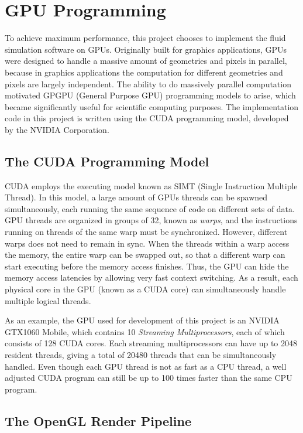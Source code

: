 \chapter{GPU Programming}

To achieve maximum performance, this project chooses to implement the fluid simulation software on GPUs. Originally built for graphics applications, GPUs were designed to handle a massive amount of geometries and pixels in parallel, because in graphics applications the computation for different geometries and pixels are largely independent. The ability to do massively parallel computation motivated GPGPU (General Purpose GPU) programming models to arise, which became significantly useful for scientific computing purposes. The implementation code in this project is written using the CUDA programming model, developed by the NVIDIA Corporation.

\section{The CUDA Programming Model}
CUDA employs the executing model known as SIMT (Single Instruction Multiple Thread). In this model, a large amount of GPUs threads can be spawned simultaneously, each running the same sequence of code on different sets of data. GPU threads are organized in groups of 32, known as \textit{warps}, and the instructions running on threads of the same warp must be synchronized. However, different warps does not need to remain in sync. When the threads within a warp access the memory, the entire warp can be swapped out, so that a different warp can start executing before the memory access finishes. Thus, the GPU can hide the memory access latencies by allowing very fast context switching. As a result, each physical core in the GPU (known as a CUDA core) can simultaneously handle multiple logical threads.

As an example, the GPU used for development of this project is an NVIDIA GTX1060 Mobile, which contains 10 \textit{Streaming Multiprocessors}, each of which consists of 128 CUDA cores. Each streaming multiprocessors can have up to 2048 resident threads, giving a total of 20480 threads that can be simultaneously handled. Even though each GPU thread is not as fast as a CPU thread, a well adjusted CUDA program can still be up to 100 times faster than the same CPU program.






\section{The OpenGL Render Pipeline}

